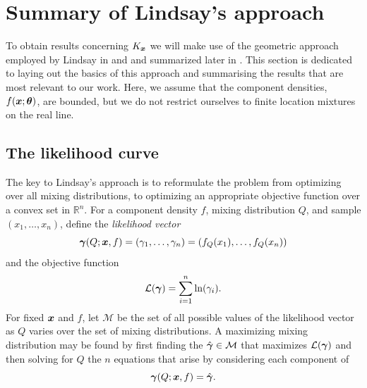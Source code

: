 \section{Summary of Lindsay's approach}
\label{sec:summary of Lindsay}

	To obtain results concerning $K_{\bm{{x}}}$ we will make use of the geometric approach employed by Lindsay in \cite{Lindsay1983-tf} and \cite{Lindsay1983a-he} and summarized later in \cite[Chapter 5]{Lindsay1995-sq}. This section is dedicated to laying out the basics of this approach and summarising the results that are most relevant to our work. Here, we assume that the component densities, $f({\bm{{x}}};{\bm{{\theta}}})$, are bounded, but we do not restrict ourselves to finite location mixtures on the real line.

	\subsection{The likelihood curve}
	The key to Lindsay's approach is to reformulate the problem from optimizing over all mixing distributions, to optimizing an appropriate objective function over a convex set in $\mathbb{R}^n$. For a component density $f$, mixing distribution $Q$, and sample $(x_1, \dots, x_n)$, define the \emph{likelihood vector}
	\begin{equation}
		{\bm{{\gamma}}}(Q;{\bm{{x}}}, f) = (\gamma_1, \dots, \gamma_n) = (f_Q(x_1), \dots, f_Q(x_n))
		\label{eq:likelihood vector}
	\end{equation}
	and the objective function
	\begin{equation}
		\mathcal{L}({\bm{{\gamma}}}) = \sum_{i = 1}^n \ln(\gamma_i).
	\end{equation}
	For fixed ${\bm{{x}}}$ and $f$, let $\mathcal{M}$ be the set of all possible values of the likelihood vector as $Q$ varies over the set of mixing distributions.
	A maximizing mixing distribution may be found by first finding the $\hat{{\bm{{\gamma}}}} \in \mathcal{M}$ that maximizes $\mathcal{L}({\bm{{\gamma}}})$ and then solving for $Q$ the $n$ equations that arise by considering each component of 
	\begin{equation}
		{\bm{{\gamma}}}(Q; {\bm{{x}}}, f) = \hat{{\bm{{\gamma}}}}.
	\end{equation}

